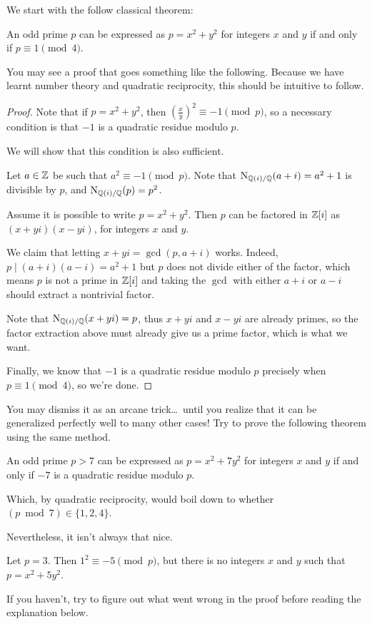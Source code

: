 We start with the follow classical theorem:
\begin{theorem}
	An odd prime $p$ can be expressed as $p = x^2 + y^2$ for integers $x$ and $y$ if and only if $p
	\equiv 1 \pmod{4}$.
\end{theorem}
You may see a proof that goes something like the following. Because we have learnt number theory and
quadratic reciprocity, this should be intuitive to follow.
\begin{proof}
	Note that if $p = x^2 + y^2$, then $\left(\frac{x}{y}\right)^2 \equiv -1 \pmod{p}$, so a
	necessary condition is that $-1$ is a quadratic residue modulo $p$.

	We will show that this condition is also sufficient.

	Let $a \in \mathbb Z$ be such that $a^2 \equiv -1 \pmod{p}$.
	Note that $\operatorname{N}_{\mathbb Q(i)/\mathbb Q}(a + i) = a^2 + 1$ is divisible by $p$, and $\operatorname{N}_{\mathbb Q(i)/\mathbb Q}(p)
	= p^2$.

	Assume it is possible to write $p = x^2 + y^2$.
	Then $p$ can be factored in $\mathbb Z[i]$ as $(x + y i)(x - y i)$, for integers $x$ and $y$.

	We claim that letting $x + y i = \gcd(p, a + i)$ works.
	Indeed, $p \mid (a + i) (a - i) = a^2 + 1$ but $p$ does not divide either of the factor, which
	means $p$ is not a prime in $\mathbb Z[i]$ and taking the $\gcd$ with either $a + i$ or $a - i$ should
	extract a nontrivial factor.

	Note that $\operatorname{N}_{\mathbb Q(i)/\mathbb Q}(x + y i) = p$, thus $x + y i$ and $x - y i$ are already primes,
	so the factor extraction above must already give us a prime factor, which is what we want.

	Finally, we know that $-1$ is a quadratic residue modulo $p$ precisely when
	$p \equiv 1 \pmod{4}$, so we're done.
\end{proof}

You may dismiss it as an arcane trick\dots\ until you realize that it can be generalized perfectly
well to many other cases!
Try to prove the following theorem using the same method.
\begin{theorem}
	An odd prime $p > 7$ can be expressed as $p = x^2 + 7 y^2$ for integers $x$ and $y$ if and only
	if $-7$ is a quadratic residue modulo $p$.
\end{theorem}
Which, by quadratic reciprocity, would boil down to whether $(p \bmod 7) \in \{ 1, 2, 4 \}$.

Nevertheless, it isn't always that nice.
\begin{example}
	Let $p = 3$. Then $1^2 \equiv -5 \pmod{p}$, but there is no integers $x$ and $y$ such that $p =
	x^2 + 5 y^2$.
\end{example}
\begin{ques}
	If you haven't, try to figure out what went wrong in the proof before reading the explanation
	below.
\end{ques}

